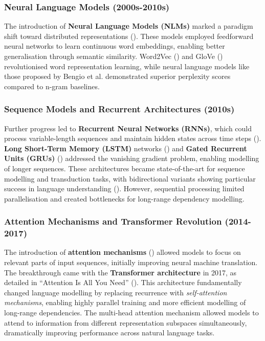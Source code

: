 \subsubsection{Neural Language Models (2000s-2010s)}
The introduction of \textbf{Neural Language Models (NLMs)} marked a paradigm shift toward distributed representations (\citep{bengio2003neural}). These models employed feedforward neural networks to learn continuous word embeddings, enabling better generalisation through semantic similarity. Word2Vec (\citep{mikolov2013word2vec}) and GloVe (\citep{pennington2014glove}) revolutionised word representation learning, while neural language models like those proposed by Bengio et al. demonstrated superior perplexity scores compared to n-gram baselines.

\subsubsection{Sequence Models and Recurrent Architectures (2010s)}
Further progress led to \textbf{Recurrent Neural Networks (RNNs)}, which could process variable-length sequences and maintain hidden states across time steps (\citep{elman1990finding}). \textbf{Long Short-Term Memory (LSTM)} networks (\citep{hochreiter1997lstm}) and \textbf{Gated Recurrent Units (GRUs)} (\citep{cho2014gru}) addressed the vanishing gradient problem, enabling modelling of longer sequences. These architectures became state-of-the-art for sequence modelling and transduction tasks, with bidirectional variants showing particular success in language understanding (\citep{graves2005bidirectional}). However, sequential processing limited parallelisation and created bottlenecks for long-range dependency modelling.

\subsubsection{Attention Mechanisms and Transformer Revolution (2014-2017)}
The introduction of \textbf{attention mechanisms} (\citep{bahdanau2014attention}) allowed models to focus on relevant parts of input sequences, initially improving neural machine translation. The breakthrough came with the \textbf{Transformer architecture} in 2017, as detailed in ``Attention Is All You Need'' (\citep{vaswani2017attention}). This architecture fundamentally changed language modelling by replacing recurrence with \textit{self-attention mechanisms}, enabling highly parallel training and more efficient modelling of long-range dependencies. The multi-head attention mechanism allowed models to attend to information from different representation subspaces simultaneously, dramatically improving performance across natural language tasks.

